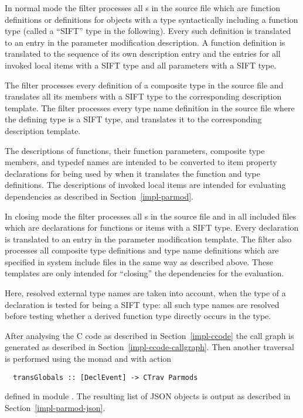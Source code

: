 In normal mode the filter processes all s in the source file which are function
definitions or definitions for objects with a type syntactically including a function type (called a ``SIFT'' 
type in the following). Every such definition is translated to an
entry in the parameter modification description. A function definition is translated to the sequence of its
own description entry and the entries for all invoked local items with a SIFT type and all parameters with 
a SIFT type.

The filter processes every definition of a composite type in the source file and translates all
its members with a SIFT type to the corresponding
description template. The filter processes every type name definition in the source file where the defining type
is a SIFT type, and translates it to the corresponding description template.

The descriptions of functions, their function parameters, composite type members, and typedef names are 
intended to be converted to item property declarations for being used by 
when it translates the function and type definitions. The descriptions of invoked local items 
are intended for evaluating dependencies as described in Section~\ref{impl-parmod}.

In closing mode the filter processes all s in the source file and in all included files which
are declarations for functions or items with a SIFT type. Every declaration is translated to an entry in the parameter
modification template. The filter also processes all composite type definitions and type name definitions which
are specified in system include files in the same way as described above. 
These templates are only intended for ``closing'' the dependencies for the evaluation.

Here, resolved external type names are taken into account, when the type of a declaration is tested for 
being a SIFT type: all such type names are resolved before testing whether a derived function type directly
occurs in the type.

After analysing the C code as described in Section~\ref{impl-ccode} the call graph is generated as described
in Section~\ref{impl-ccode-callgraph}. Then another traversal is performed using the  monad and
 with action
\begin{verbatim}
  transGlobals :: [DeclEvent] -> CTrav Parmods
\end{verbatim}
defined in module . The resulting list of JSON objects is output as described 
in Section~\ref{impl-parmod-json}.

